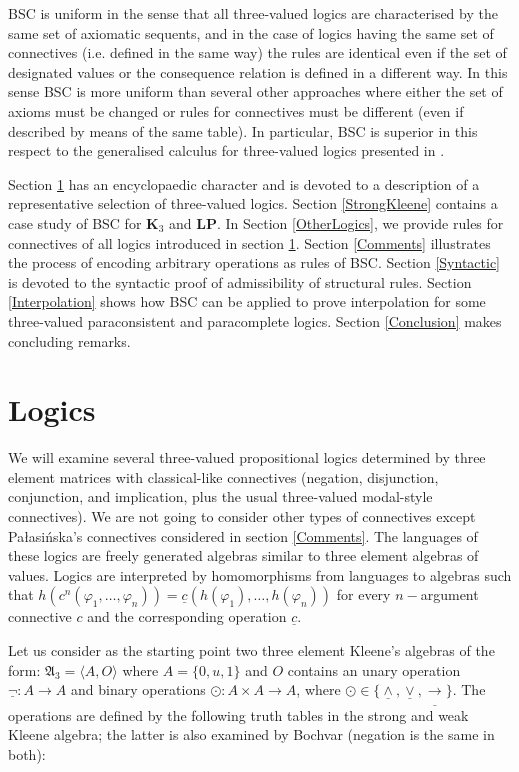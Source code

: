 \documentclass[10pt,a4paper]{article}
\theoremstyle{definition}
\newcommand{\3}{\vspace{.3in}}
\newcommand{\2}{\vspace{.2in}}
\newcommand{\1}{\vspace{.1in}}
\newcommand{\5}{\vspace{.05in}}
\begin{document}
BSC is uniform in the sense that all three-valued logics are characterised by the same set of axiomatic sequents, and in the case of logics having the same set of connectives (i.e. defined in the same way) the rules are identical even if the set of designated values or the consequence relation is defined in a different way. In this sense BSC is more uniform than several other approaches where either the set of axioms must be changed or rules for connectives must be different (even if described by means of the same table). In particular, BSC is superior in this respect to the generalised calculus for three-valued logics presented in \cite{Indrzejczak2}. 


Section \ref{Logics} has an encyclopaedic character and is devoted to a description of a representative selection of three-valued logics. Section \ref{StrongKleene} contains a case study of BSC for {\bf K$_3$} and {\bf LP}. In Section \ref{OtherLogics}, we provide rules for connectives of all logics introduced in section \ref{Logics}. Section \ref{Comments} illustrates the process of encoding arbitrary operations as rules of BSC. Section \ref{Syntactic} is devoted to the syntactic proof of admissibility of structural rules. Section \ref{Interpolation} shows how BSC can be applied to prove interpolation for some three-valued paraconsistent and paracomplete logics. Section \ref{Conclusion} makes concluding remarks.

\section{Logics}\label{Logics}
We will examine several three-valued propositional logics determined by three element matrices with classical-like connectives (negation, disjunction, conjunction, and implication, plus the usual three-valued modal-style connectives). We are not going to consider other types of connectives except Pa\l{}asi\'{n}ska's connectives considered in section \ref{Comments}. 
The languages of these logics are freely generated algebras similar to three element algebras of values. Logics are interpreted by homomorphisms from languages to algebras such that $h(c^n(\varphi_1, \ldots, \varphi_n))= \underline{c}(h(\varphi_1), \ldots, h(\varphi_n))$ for every $n-$argument connective $c$ and the corresponding operation $\underline{c}$.  

Let us consider as the starting point two three element Kleene's algebras of the form: $\mathfrak{A}_3 = \langle A, O\rangle$ where $A=\{0, u, 1\}$ and $O$ contains an unary
operation $\underline{\neg}:A\longrightarrow A$ and binary operations $\odot: A\times A\longrightarrow A $,
where $\odot \in \{\underline{\wedge} , \underline{\vee} , \underline{\rightarrow} \}$. 
The operations are defined by
the following truth tables in the strong and weak Kleene algebra; the latter is also examined by Bochvar \cite{Bochvar} (negation is the same in both):
\end{document}
